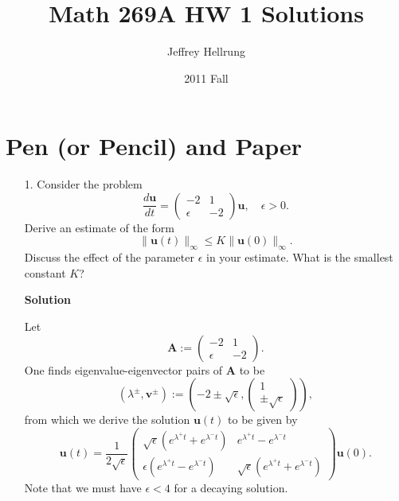 \documentclass{article}
\title{Math 269A HW 1 Solutions}
\date{2011 Fall}
\author{Jeffrey Hellrung}
\begin{document}
\maketitle

\section{Pen (or Pencil) and Paper}

\begin{itemize}

\item[1.] Consider the problem
\begin{equation*}
\frac{d\mathbf{u}}{dt} = \begin{pmatrix} -2 & 1 \\ \epsilon & -2 \end{pmatrix} \mathbf{u}, \quad \epsilon > 0.
\end{equation*}
Derive an estimate of the form
\begin{equation*}
\lVert \mathbf{u}(t) \rVert_{\infty} \leq K \lVert \mathbf{u}(0) \rVert_{\infty}.
\end{equation*}
Discuss the effect of the parameter $\epsilon$ in your estimate. What is the smallest constant $K$?

{\bf Solution}

Let
\begin{equation*}
\mathbf{A} := \begin{pmatrix} -2 & 1 \\ \epsilon & -2 \end{pmatrix}.
\end{equation*}
One finds eigenvalue-eigenvector pairs of $\mathbf{A}$ to be
\begin{equation*}
\left( \lambda^{\pm}, \mathbf{v}^{\pm} \right) := \left( -2 \pm \sqrt{\epsilon}, \begin{pmatrix} 1 \\ \pm \sqrt{\epsilon} \end{pmatrix} \right),
\end{equation*}
from which we derive the solution $\mathbf{u}(t)$ to be given by
\begin{equation*}
\mathbf{u}(t) = \frac{1}{2 \sqrt{\epsilon}} \begin{pmatrix} \sqrt{\epsilon} \left( e^{\lambda^+t} + e^{\lambda^-t} \right) & e^{\lambda^+t} - e^{\lambda^-t} \\ \epsilon \left( e^{\lambda^+t} - e^{\lambda^-t} \right) & \sqrt{\epsilon} \left( e^{\lambda^+t} + e^{\lambda^-t} \right) \end{pmatrix} \mathbf{u}(0).
\end{equation*}
Note that we must have $\epsilon < 4$ for a decaying solution.


\end{itemize}
\end{document}
